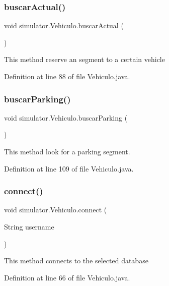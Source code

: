 \subsubsection{\texorpdfstring{buscar\+Actual()}{buscarActual()}}
{\footnotesize\ttfamily void simulator.\+Vehiculo.\+buscar\+Actual (\begin{DoxyParamCaption}{ }\end{DoxyParamCaption})}

This method reserve an segment to a certain vehicle 

Definition at line 88 of file Vehiculo.\+java.

\mbox{\label{classsimulator_1_1_vehiculo_aa59295cc134f0db04e5b822ec7d6d147}} 
\subsubsection{\texorpdfstring{buscar\+Parking()}{buscarParking()}}
{\footnotesize\ttfamily void simulator.\+Vehiculo.\+buscar\+Parking (\begin{DoxyParamCaption}{ }\end{DoxyParamCaption})}

This method look for a parking segment. 

Definition at line 109 of file Vehiculo.\+java.

\mbox{\label{classsimulator_1_1_vehiculo_a7dc301ce9a868990dea8e406dd038979}} 
\subsubsection{\texorpdfstring{connect()}{connect()}}
{\footnotesize\ttfamily void simulator.\+Vehiculo.\+connect (\begin{DoxyParamCaption}\item[{String}]{username }\end{DoxyParamCaption})}

This method connects to the selected database 

Definition at line 66 of file Vehiculo.\+java.

